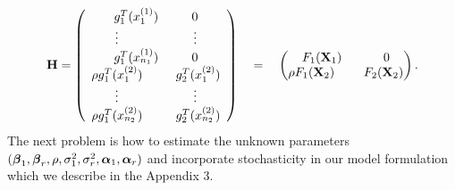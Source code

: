 \[ {\bf H}=
\left(
\begin{array}{cc}
g_1^T(x_1^{(1)}) ~~~~~~~~0\\
\vdots   ~~~~~~~~~~~~~~~~~~ \vdots       \\
g_1^T(x_{n_1}^{(1)}) ~~~~~~~~0  \\

\rho g_1^T(x_1^{(2)}) ~~~~~~~~g_2^T(x_1^{(2)})\\
\vdots   ~~~~~~~~~~~~~~~~~~ \vdots       \\
\rho g_1^T(x_{n_2}^{(2)}) ~~~~~~~~g_2^T(x_{n_2}^{(2)})
\end{array} 
\right)
 \quad = \quad
\begin{pmatrix}
F_1({\bf X}_1)~~~~~~~~~~0\\
\rho F_1({\bf X}_2) ~~~~~~~F_2({\bf X}_2)
\end{pmatrix}.
\]
The next problem is how to estimate the unknown parameters $({\boldsymbol{\beta}}_1,{\boldsymbol{\beta}}_r,\rho,\sigma_1^2,\sigma_r^2,{\boldsymbol{\alpha}}_1,{\boldsymbol{\alpha}}_r)$ and incorporate stochasticity in our model formulation which we describe in the Appendix 3. 


